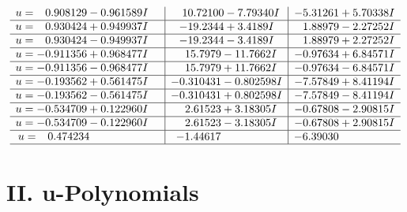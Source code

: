 \documentclass[1p]{elsarticle_modified}
\theoremstyle{definition}
\begin{document}
$$\begin{array}{c|c|c}
\begin{aligned}
u &= \phantom{-}0.908129 - 0.961589 I\end{aligned}
 & \phantom{-}10.72100 - 7.79340 I & -5.31261 + 5.70338 I \\ \hline\begin{aligned}
u &= \phantom{-}0.930424 + 0.949937 I\end{aligned}
 & -19.2344 + 3.4189 I & \phantom{-}1.88979 - 2.27252 I \\ \hline\begin{aligned}
u &= \phantom{-}0.930424 - 0.949937 I\end{aligned}
 & -19.2344 - 3.4189 I & \phantom{-}1.88979 + 2.27252 I \\ \hline\begin{aligned}
u &= -0.911356 + 0.968477 I\end{aligned}
 & \phantom{-}15.7979 - 11.7662 I & -0.97634 + 6.84571 I \\ \hline\begin{aligned}
u &= -0.911356 - 0.968477 I\end{aligned}
 & \phantom{-}15.7979 + 11.7662 I & -0.97634 - 6.84571 I \\ \hline\begin{aligned}
u &= -0.193562 + 0.561475 I\end{aligned}
 & -0.310431 - 0.802598 I & -7.57849 + 8.41194 I \\ \hline\begin{aligned}
u &= -0.193562 - 0.561475 I\end{aligned}
 & -0.310431 + 0.802598 I & -7.57849 - 8.41194 I \\ \hline\begin{aligned}
u &= -0.534709 + 0.122960 I\end{aligned}
 & \phantom{-}2.61523 + 3.18305 I & -0.67808 - 2.90815 I \\ \hline\begin{aligned}
u &= -0.534709 - 0.122960 I\end{aligned}
 & \phantom{-}2.61523 - 3.18305 I & -0.67808 + 2.90815 I \\ \hline\begin{aligned}
u &= \phantom{-}0.474234\phantom{ +0.000000I}\end{aligned}
 & -1.44617\phantom{ +0.000000I} & -6.39030\phantom{ +0.000000I}\\
 \hline 
 \end{array}$$\newpage
\newpage\renewcommand{\arraystretch}{1}
\centering \section*{ II. u-Polynomials}
\end{document}
